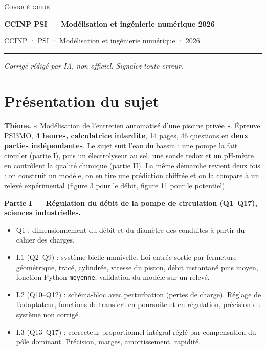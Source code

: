 \documentclass[11pt,a4paper]{article}
\providecommand{\tightlist}{\setlength{\itemsep}{0pt}\setlength{\parskip}{0pt}}
\begin{document}
\thispagestyle{plain}
\begin{center}
  {\small\scshape Corrigé guidé}\par\smallskip
  {\LARGE\bfseries CCINP PSI — Modélisation et ingénierie numérique 2026\par}\medskip
  {\large CCINP · PSI · Modélisation et ingénierie numérique · 2026\par}
\end{center}
\vspace{2pt}\hrule\vspace{8pt}

\emph{Corrigé rédigé par IA, non officiel. Signalez toute erreur.}

\hypertarget{pruxe9sentation-du-sujet}{%
\section{Présentation du sujet}\label{pruxe9sentation-du-sujet}}

\textbf{Thème.} « Modélisation de l'entretien automatisé d'une piscine privée ». Épreuve PSI3MO, \textbf{4 heures, calculatrice interdite}, 14 pages, 46 questions en \textbf{deux parties indépendantes}. Le sujet suit l'eau du bassin : une pompe la fait circuler (partie I), puis un électrolyseur au sel, une sonde redox et un pH-mètre en contrôlent la qualité chimique (partie II). La même démarche revient deux fois : on construit un modèle, on en tire une prédiction chiffrée et on la compare à un relevé expérimental (figure 3 pour le débit, figure 11 pour le potentiel).

\textbf{Partie I --- Régulation du débit de la pompe de circulation (Q1--Q17), sciences industrielles.}

\begin{itemize}
\tightlist
\item
  Q1 : dimensionnement du débit et du diamètre des conduites à partir du cahier des charges.
\item
  I.1 (Q2--Q9) : système bielle-manivelle. Loi entrée-sortie par fermeture géométrique, tracé, cylindrée, vitesse du piston, débit instantané puis moyen, fonction Python \texttt{moyenne}, validation du modèle sur un relevé.
\item
  I.2 (Q10--Q12) : schéma-bloc avec perturbation (pertes de charge). Réglage de l'adaptateur, fonctions de transfert en poursuite et en régulation, précision du système non corrigé.
\item
  I.3 (Q13--Q17) : correcteur proportionnel intégral réglé par compensation du pôle dominant. Précision, marges, amortissement, rapidité.
\end{itemize}
\end{document}
